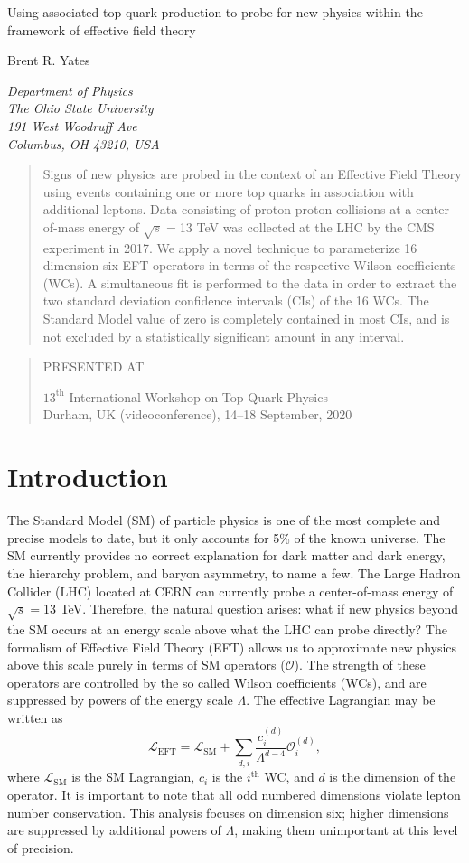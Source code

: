 \documentclass[12pt]{article}
\newcommand\pubnumber{SNSN-323-63}
\newcommand\pubdate{\today}
\def\institute{Department of Physics\\The Ohio State University\\
191 West Woodruff Ave\\
Columbus, OH 43210, USA}
\def\Title#1{\begin{center} {\Large #1 } \end{center}}
\def\Author#1{\begin{center}{ \sc #1} \end{center}}
\def\Address#1{\begin{center}{ \it #1} \end{center}}
\newcommand\pubblock{\rightline{\begin{tabular}{l} \pubnumber\\
         \pubdate  \end{tabular}}}
\newenvironment{Abstract}{\begin{quotation}  }{\end{quotation}}
\newenvironment{Presented}{\begin{quotation} \begin{center} 
             PRESENTED AT\end{center}\bigskip 
      \begin{center}\begin{large}}{\end{large}\end{center} \end{quotation}}
\begin{document}
\begin{titlepage}
\pubblock

\vfill
\Title{Using associated top quark production to probe for new physics within the framework of effective field theory}
\vfill
\Author{Brent R. Yates}
\Address{\institute}
\vfill
\begin{Abstract}
Signs of new physics are probed in the context of an Effective Field Theory using events containing one or more top quarks in association with additional leptons. Data consisting of proton-proton collisions at a center-of-mass energy of $\sqrt{s}=$13 TeV was collected at the LHC by the CMS experiment in 2017. We apply a novel technique to parameterize 16 dimension-six EFT operators in terms of the respective Wilson coefficients (WCs). A simultaneous fit is performed to the data in order to extract the two standard deviation confidence intervals (CIs) of the 16 WCs. The Standard Model value of zero is completely contained in most CIs, and is not excluded by a statistically significant amount in any interval.
\end{Abstract}
\vfill
\begin{Presented}
$13^\mathrm{th}$ International Workshop on Top Quark Physics\\
Durham, UK (videoconference), 14--18 September, 2020
\end{Presented}
\vfill
\end{titlepage}
\def\thefootnote{\fnsymbol{footnote}}
\setcounter{footnote}{0}
%

\section{Introduction}

The Standard Model (SM) of particle physics is one of the most complete and precise models to date, but it only accounts for 5\% of the known universe. The SM currently provides no correct explanation for dark matter and dark energy, the hierarchy problem, and baryon asymmetry, to name a few. The Large Hadron Collider (LHC) located at CERN can currently probe a center-of-mass energy of $\sqrt{s}=$13 TeV. Therefore, the natural question arises: what if new physics beyond the SM occurs at an energy scale above what the LHC can probe directly? The formalism of Effective Field Theory (EFT) allows us to approximate new physics above this scale purely in terms of SM operators ($\mathcal{O}$). The strength of these operators are controlled by the so called Wilson coefficients (WCs), and are suppressed by powers of the energy scale $\Lambda$. The effective Lagrangian may be written as
\begin{equation}
	\mathcal{L}_{\mathrm{EFT}} = \mathcal{L}_{\mathrm{SM}} + \sum_{d,i} \frac{c_i^{(d)}}{\Lambda^{d-4}}\mathcal{O}_{i}^{(d)},
\end{equation}
where $\mathcal{L}_{\mathrm{SM}}$ is the SM Lagrangian, $c_{i}$ is the $i^{\mathrm{th}}$ WC, and $d$ is the dimension of the operator. It is important to note that all odd numbered dimensions violate lepton number conservation. This analysis focuses on dimension six; higher dimensions are suppressed by additional powers of $\Lambda$, making them unimportant at this level of precision.\\
\end{document}
